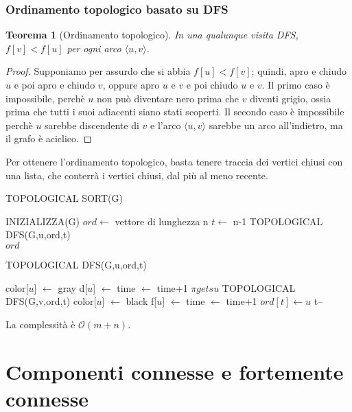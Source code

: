 \documentclass[11pt]{article}
\newtheorem*{theorem}{Teorema}
\begin{document}
\subsubsection{Ordinamento topologico basato su DFS}
\begin{theorem}[Ordinamento topologico]
    In una qualunque visita DFS, $f[v]<f[u]$ per ogni arco $\langle u,v \rangle$.
\end{theorem}
\begin{proof}
    Supponiamo per assurdo che si abbia $f[u]<f[v]$; quindi, apro e chiudo $u$ e poi apro e chiudo $v$, oppure apro $u$ 
    e $v$ e poi chiudo $u$ e $v$. Il primo caso è impossibile, perchè $u$ non può diventare nero prima che $v$ diventi 
    grigio, ossia prima che tutti i suoi adiacenti siano stati scoperti. Il secondo caso è impossibile perchè $u$ sarebbe 
    discendente di $v$ e l'arco $\langle u,v \rangle$ sarebbe un arco all'indietro, ma il grafo è aciclico.
\end{proof}
Per ottenere l'ordinamento topologico, basta tenere traccia dei vertici chiusi con una lista, che conterrà i vertici chiusi, 
dal più al meno recente.
\begin{algorithm}[H]
    \caption{TOPOLOGICAL SORT(G)}
    \begin{algorithmic}
        \State INIZIALIZZA(G)
        \State $ord \gets$ vettore di lunghezza n 
        \State $t \gets$ n-1
                \State TOPOLOGICAL DFS(G,u,ord,t)
            \EndIf
        \EndFor\\
        \Return $ord$
    \end{algorithmic}
\end{algorithm}
\begin{algorithm}[H]
    \caption{TOPOLOGICAL DFS(G,u,ord,t)}
    \begin{algorithmic}
        \State color[$u$] $\gets$ gray 
        \State d[$u$] $\gets$ time $\gets$ time+1
                \State $\pi gets u$
                \State TOPOLOGICAL DFS(G,v,ord,t)
            \EndIf 
        \EndFor 
        \State color[$u$] $\gets$ black 
        \State f[$u$] $\gets$ time $\gets$ time+1
        \State $ord[t] \gets u$
        \State t--
    \end{algorithmic}
\end{algorithm}
La complessità è $\mathcal{O}(m+n)$.
\section{Componenti connesse e fortemente connesse}
\end{document}
